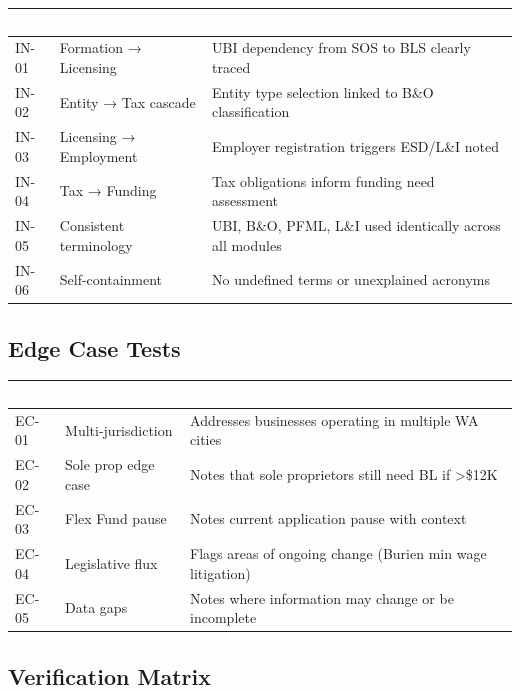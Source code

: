 \documentclass[11pt,letterpaper]{article}
\newcommand{\tableheader}[1]{\textbf{\sffamily\textcolor{white}{#1}}}
\begin{document}
\begin{center}
\begin{tabularx}{\textwidth}{C{1.2cm}L{3.5cm}X}
\toprule
{}
\tableheader{ID} & \tableheader{Verifies} & \tableheader{Expected Behavior} \\
\midrule
IN-01 & Formation → Licensing & UBI dependency from SOS to BLS clearly traced \\
IN-02 & Entity → Tax cascade & Entity type selection linked to B\&O classification \\
IN-03 & Licensing → Employment & Employer registration triggers ESD/L\&I noted \\
IN-04 & Tax → Funding & Tax obligations inform funding need assessment \\
IN-05 & Consistent terminology & UBI, B\&O, PFML, L\&I used identically across all modules \\
IN-06 & Self-containment & No undefined terms or unexplained acronyms \\
\bottomrule
\end{tabularx}
\end{center}

\subsection{Edge Case Tests}

\begin{center}
\begin{tabularx}{\textwidth}{C{1.2cm}L{3.5cm}X}
\toprule
{}
\tableheader{ID} & \tableheader{Verifies} & \tableheader{Expected Behavior} \\
\midrule
EC-01 & Multi-jurisdiction & Addresses businesses operating in multiple WA cities \\
EC-02 & Sole prop edge case & Notes that sole proprietors still need BL if >\$12K \\
EC-03 & Flex Fund pause & Notes current application pause with context \\
EC-04 & Legislative flux & Flags areas of ongoing change (Burien min wage litigation) \\
EC-05 & Data gaps & Notes where information may change or be incomplete \\
\bottomrule
\end{tabularx}
\end{center}

\subsection{Verification Matrix}
\end{document}
